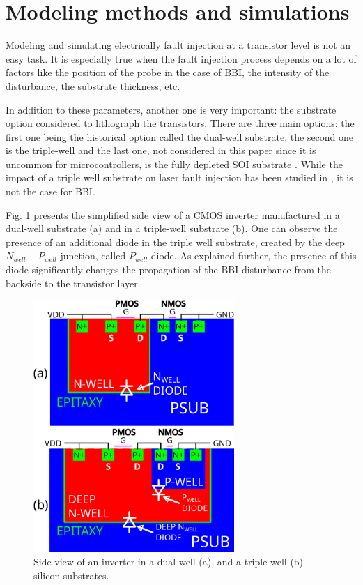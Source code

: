 \documentclass[10pt, conference, compsocconf]{IEEEtran}
\begin{document}
\section{Modeling methods and simulations}
\label{section:model}
Modeling and simulating electrically fault injection at a transistor level is not an easy task. It is especially true when the fault injection process depends on a lot of factors like the position of the probe in the case of BBI, the intensity of the disturbance, the substrate thickness, etc.

In addition to these parameters, another one is very important: the substrate option considered to lithograph the transistors. There are three main options: the first one being the historical option called the dual-well substrate, the second one is the triple-well and the last one, not considered in this paper since it is uncommon for microcontrollers, is the fully depleted SOI substrate \cite{chinoisFDSOI}. While the impact of a triple well substrate on laser fault injection has been studied in \cite{lfitriplewell}, it is not the case for BBI.

Fig. \ref{fig_dual_triple} presents the simplified side view of a CMOS inverter manufactured in a dual-well substrate (a) and in a triple-well substrate (b). One can observe the presence of an additional diode in the triple well substrate, created by the deep $N_{well}-P_{well}$ junction, called $P_{well}$ diode. As explained further, the presence of this diode significantly changes the propagation of the BBI disturbance from the backside to the transistor layer.

\begin{figure}[!ht]
\centering
\includegraphics[width=3in]{DUAL+TRIPLE.eps}
\caption{Side view of an inverter in a dual-well (a), and a triple-well (b) silicon substrates.}
\label{fig_dual_triple}
\end{figure}
\end{document}
